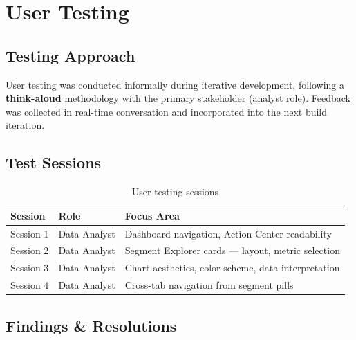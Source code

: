 \documentclass[11pt,a4paper]{article}
\begin{document}
\section{User Testing}

\subsection{Testing Approach}

User testing was conducted informally during iterative development, following a
\textbf{think-aloud} methodology with the primary stakeholder (analyst role).
Feedback was collected in real-time conversation and incorporated into the
next build iteration.

\subsection{Test Sessions}

\begin{table}[H]
\centering\small
\begin{tabular}{p{3cm}p{3cm}p{7cm}}
\toprule
\textbf{Session} & \textbf{Role} & \textbf{Focus Area} \\
\midrule
Session 1 & Data Analyst    & Dashboard navigation, Action Center readability \\
Session 2 & Data Analyst    & Segment Explorer cards — layout, metric selection \\
Session 3 & Data Analyst    & Chart aesthetics, color scheme, data interpretation \\
Session 4 & Data Analyst    & Cross-tab navigation from segment pills \\
\bottomrule
\end{tabular}
\caption{User testing sessions}
\end{table}

\subsection{Findings \& Resolutions}
\end{document}
